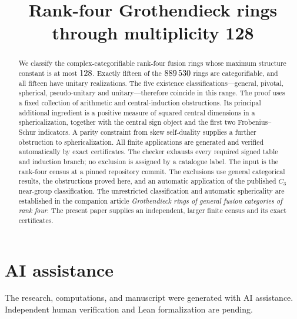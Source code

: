 \documentclass[11pt]{article}
\title{Rank-four Grothendieck rings\\through multiplicity 128}
\date{}
\begin{document}
\maketitle
\begin{abstract}
We classify the complex-categorifiable rank-four fusion rings whose maximum
structure constant is at most $128$. Exactly fifteen of the $889\,530$ rings are categorifiable, and all fifteen have
unitary realizations. The five existence classifications---general, pivotal,
spherical, pseudo-unitary and unitary---therefore coincide in this range.
The proof uses a fixed collection of arithmetic and central-induction
obstructions. Its principal additional ingredient is a positive measure of
squared central dimensions in a sphericalization, together with the central
sign object and the first two Frobenius--Schur indicators. A parity
constraint from skew self-duality supplies a further obstruction to
sphericalization. All finite applications are generated and verified automatically by exact
certificates. The checker exhausts every required signed
table and induction branch; no exclusion is assigned by a catalogue label.
The input is the rank-four census at a pinned repository commit. The exclusions use general
categorical results, the obstructions proved here, and an automatic
application of the published $C_3$ near-group classification.
The unrestricted classification and automatic sphericality are established
in the companion article \emph{Grothendieck rings of general fusion categories of rank four}. The present paper supplies an independent,
larger finite census and its exact certificates.
\end{abstract}
\ResearchNotice

\tableofcontents








\appendix



\section*{AI assistance}
The research, computations, and manuscript were generated with AI assistance. Independent human verification and Lean formalization are pending.

\end{document}
